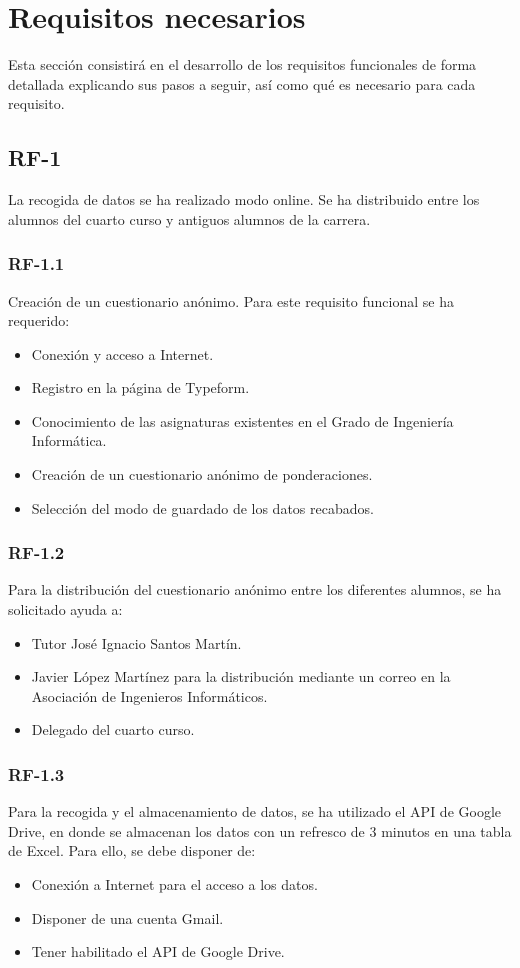 \section{Requisitos necesarios}
Esta sección consistirá en el desarrollo de los requisitos funcionales de forma detallada explicando sus pasos a seguir, así como qué es necesario para cada requisito. 
\subsection{RF-1}
La recogida de datos se ha realizado modo online. Se ha distribuido entre los alumnos del cuarto curso y antiguos alumnos de la carrera. 
\subsubsection{RF-1.1}
Creación de un cuestionario anónimo. Para este requisito funcional se ha requerido: 
\begin{itemize}
\item Conexión  y acceso a Internet. 
\item Registro en la página de Typeform. 
\item Conocimiento de las asignaturas existentes en el Grado de Ingeniería Informática. 
\item Creación de un cuestionario anónimo de ponderaciones. 
\item Selección del modo de guardado de los datos recabados. 
\end{itemize}

\subsubsection{RF-1.2}
Para la distribución del cuestionario anónimo entre los diferentes alumnos, se ha solicitado ayuda a: 
\begin{itemize}
\item Tutor José Ignacio Santos Martín. 
\item Javier López Martínez para la distribución mediante un correo en la Asociación de Ingenieros Informáticos. 
\item Delegado del cuarto curso. 
\end{itemize}

\subsubsection{RF-1.3}
Para la recogida y el almacenamiento de datos, se ha utilizado el API de Google Drive, en donde se almacenan los datos con un refresco de 3 minutos en una tabla de Excel. Para ello, se debe disponer de: 
\begin{itemize}
\item Conexión a Internet para el acceso a los datos. 
\item Disponer de una cuenta Gmail. 
\item Tener habilitado el API de Google Drive. 
\end{itemize}

